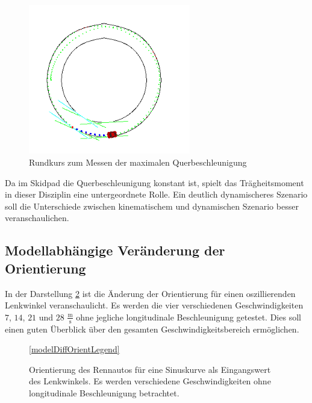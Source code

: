\documentclass{like}
\begin{document}
\begin{figure}
	\centering
	\includegraphics[width=200pt]{Abbildungen/roundCourse.png}
	\caption{Rundkurs zum Messen der maximalen Querbeschleunigung}
	\label{fig:roundCourse}
\end{figure}

Da im Skidpad die Querbeschleunigung konstant ist, spielt das Trägheitsmoment in dieser Disziplin eine untergeordnete Rolle.
Ein deutlich dynamischeres Szenario soll die Unterschiede zwischen kinematischem und dynamischen Szenario besser veranschaulichen.

\subsection{Modellabhängige Veränderung der Orientierung}
In der Darstellung \ref{fig:modelDiffOrient} ist die Änderung der Orientierung für einen oszillierenden Lenkwinkel veranschaulicht. Es werden die vier verschiedenen Geschwindigkeiten $7$, $14$, $21$ und $28$ $\frac{\text{m}}{\text{s}}$ ohne jegliche longitudinale Beschleunigung getestet. Dies soll einen guten Überblick über den gesamten Geschwindigkeitsbereich ermöglichen.

\begin{figure}
	\centering
	\subfigure{
		 
	}%
	\subfigure{
		 
	}	
	
	\ref{modelDiffOrientLegend}
	\caption{Orientierung des Rennautos für eine Sinuskurve als Eingangswert des Lenkwinkels. Es werden verschiedene Geschwindigkeiten ohne longitudinale Beschleunigung betrachtet.}\label{fig:modelDiffOrient}
\end{figure}
\end{document}
